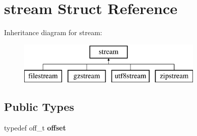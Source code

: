\hypertarget{structstream}{}\section{stream Struct Reference}
\label{structstream}
Inheritance diagram for stream\+:\begin{figure}[H]
\begin{center}
\leavevmode
\includegraphics[height=2.000000cm]{structstream}
\end{center}
\end{figure}
\subsection*{Public Types}
\begin{DoxyCompactItemize}
\item 
\mbox{\label{structstream_a8920d8eee5deb13782ffb3fdb5f80a88}} 
typedef off\+\_\+t {\bfseries offset}
\end{DoxyCompactItemize}
